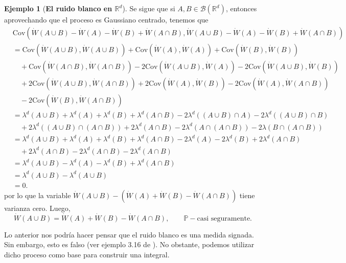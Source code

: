 \documentclass[letterpaper,twoside,12pt]{book}
\newcommand{\R}{\mathbb{R}}
\newcommand{\B}{\mathcal{B}}
\renewcommand{\P}{\mathbb{P}}
\newcommand{\W}{\dot{W}}
\newcommand{\1}{\mathds{1}}
\theoremstyle{definition}
\theoremstyle{definition}
\theoremstyle{remark}
\theoremstyle{definition}
\theoremstyle{definition}
\theoremstyle{definition}
\theoremstyle{definition}
\newtheorem{ejem}{Ejemplo}
\theoremstyle{definition}
\begin{document}
\begin{ejem}[\textbf{El ruido blanco en $\R^{d}$}]
Se sigue que si $A,B\in \B(\R^d)$, entonces aprovechando que el proceso es Gaussiano centrado, tenemos que
\begin{align*}
    &\text{Cov}\left(\W(A\cup B)-\W(A)-\W(B)+\W(A\cap B),\W(A\cup B)-\W(A)-\W(B)+\W(A\cap B)\right)\\
    &=\text{Cov}\left(\W(A\cup B),\W(A\cup B)\right)+\text{Cov}\left(\W(A),\W(A)\right)+\text{Cov}\left(\W(B),\W(B)\right)\\
    &\quad +\text{Cov}\left(\W(A\cap B),\W(A\cap B)\right)-2 \text{Cov}\left(\W(A\cup B),\W(A)\right)-2 \text{Cov}\left(\W(A\cup B), \W(B)\right)\\
    &\quad +2 \text{Cov}\left(\W(A\cup B), \W(A\cap B)\right)+2 \text{Cov}\left(\W(A),\W(B)\right)-2 \text{Cov}\left(\W(A),\W(A\cap B)\right)\\
    &\quad -2 \text{Cov}\left(\W(B),\W(A\cap B)\right)\\
    &=\lambda^{d}(A\cup B)+\lambda^{d}(A)+\lambda^{d}(B)+\lambda^{d}(A\cap B)-2\lambda^{d}((A\cup B)\cap A)-2\lambda^{d}((A\cup B)\cap B)\\
    &\quad+2\lambda^{d}((A\cup B)\cap (A\cap B))+2\lambda^{d}(A\cap B)-2\lambda^{d}(A\cap (A\cap B))-2\lambda(B\cap(A\cap B))\\
    &=\lambda^{d}(A\cup B)+\lambda^d(A)+\lambda^{d}(B)+\lambda^{d}(A\cap B)-2\lambda^{d}(A)-2\lambda^{d}(B)+2\lambda^{d}(A\cap B)\\
    &\quad +2\lambda^{d}(A\cap B)-2\lambda^{d}(A\cap B)-2\lambda^{d}(A\cap B)\\
    &=\lambda^{d}(A\cup B)-\lambda^d(A)-\lambda^{d}(B)+\lambda^{d}(A\cap B)\\
    &=\lambda^{d}(A\cup B)-\lambda^{d}(A\cup B)\\
    &=0.
\end{align*}
por lo que la variable $\W(A\cup B)-(\W(A)+\W(B)-\W(A\cap B))$ tiene varianza cero. Luego,
\begin{equation}\label{Wdotmeasure}    
    \W(A\cup B)=\W(A)+\W(B)-\W(A\cap B), \qquad \P-\text{casi seguramente}.
\end{equation}


\end{ejem}
Lo anterior nos podría hacer pensar que el ruido blanco es una medida signada. Sin embargo, esto es falso (ver ejemplo 3.16 de \cite{Khoshnevisan2009}). No obstante, podemos utilizar dicho proceso como base para construir una integral.
\end{document}
